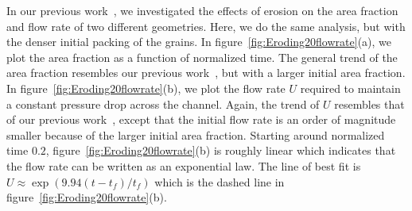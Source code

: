 \documentclass{jfm}
\begin{document}
In our previous work~\citep{qua-moo2018}, we investigated the effects of
erosion on the area fraction and flow rate of two different geometries.
Here, we do the same analysis, but with the denser initial packing of
the grains. In figure~\ref{fig:Eroding20flowrate}(a), we plot the area
fraction as a function of normalized time.  The general trend of the
area fraction resembles our previous work~\citep[see][figure
10(a)]{qua-moo2018}, but with a larger initial area fraction.  In
figure~\ref{fig:Eroding20flowrate}(b), we plot the flow rate $U$
required to maintain a constant pressure drop across the channel.
Again, the trend of $U$ resembles that of our previous
work~\citep[see][figure 10(b)]{qua-moo2018}, except that the initial
flow rate is an order of magnitude smaller because of the larger initial
area fraction.  Starting around normalized time $0.2$,
figure~\ref{fig:Eroding20flowrate}(b) is roughly linear which indicates
that the flow rate can be written as an exponential law.  The line of
best fit is $U \approx \exp(9.94(t-t_f)/t_f)$ which is the dashed line
in figure~\ref{fig:Eroding20flowrate}(b).
\end{document}
